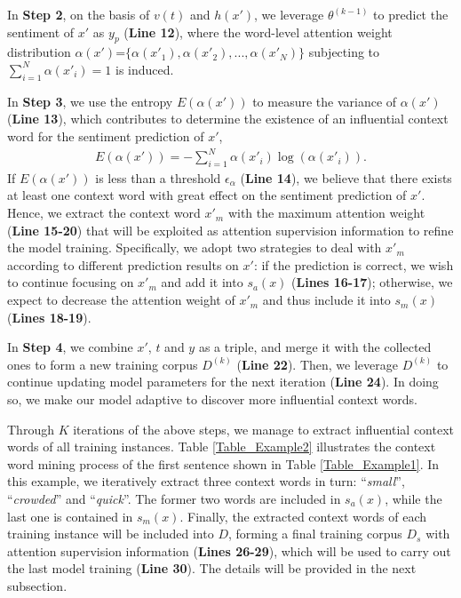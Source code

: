 \documentclass[11pt,a4paper]{article}
\begin{document}
In \textbf{Step 2},
on the basis of $v(t)$ and $h(x')$,
we leverage $\theta^{(k-1)}$ to predict the sentiment of $x'$ as $y_p$ (\textbf{Line 12}),
where the word-level attention weight distribution $\alpha(x')$=$\{\alpha(x'_1),\alpha(x'_2),...,\alpha(x'_N)\}$
subjecting to $\sum^N_{i=1}\alpha{(x'_i)}=1$ is induced.


In \textbf{Step 3},
we use the entropy $E(\alpha(x'))$ to measure the variance of $\alpha(x')$ (\textbf{Line 13}),
which contributes to determine the existence of an influential context word for the sentiment prediction of $x'$,
\begin{align}\label{Eqa_Entropy}
E(\alpha(x')) = -\sum^N_{i=1} \alpha(x'_i) \log(\alpha(x'_i)).
\end{align}If $E(\alpha(x'))$ is less than a threshold $\epsilon_{\alpha}$ (\textbf{Line 14}),
we believe that there exists at least one context word with great effect on the sentiment prediction of $x'$.
Hence,
we extract the context word $x'_m$ with the maximum attention weight (\textbf{Line 15-20})
that will be exploited as attention supervision information to refine the model training.
Specifically,
we adopt two strategies to deal with $x'_m$ according to different prediction results on $x'$:
if the prediction is correct,
we wish to continue focusing on $x'_m$ and add it into $s_a(x)$ (\textbf{Lines 16-17});
otherwise,
we expect to decrease the attention weight of $x'_m$ and thus include it into $s_m(x)$ (\textbf{Lines 18-19}).


In \textbf{Step 4},
we combine $x'$, $t$ and $y$ as a triple,
and merge it with the collected ones to form a new training corpus $D^{(k)}$ (\textbf{Line 22}).
Then,
we leverage $D^{(k)}$ to continue updating model parameters for the next iteration (\textbf{Line 24}).
In doing so,
we make our model adaptive to discover more influential context words.

Through $K$ iterations of the above steps,
we manage to extract influential context words of all training instances.
Table \ref{Table_Example2} illustrates the context word mining process of the first sentence shown in Table \ref{Table_Example1}.
In this example,
we iteratively extract three context words in turn: ``\emph{small}'', ``\emph{crowded}'' and ``\emph{quick}''.
The former two words are included in $s_a(x)$,
while the last one is contained in $s_m(x)$.
Finally,
the extracted context words of each training instance will be included into $D$,
forming a final training corpus $D_s$ with
attention supervision information (\textbf{Lines 26-29}),
which will be used to carry out the last model training (\textbf{Line 30}).
The details will be provided in the next subsection.
\end{document}
